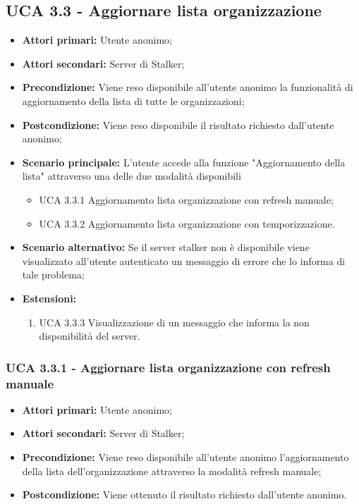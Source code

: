 \subsection{UCA 3.3 - Aggiornare lista organizzazione}%
\begin{itemize} 
	\item \textbf{Attori primari:} Utente anonimo;
	\item \textbf{Attori secondari:} Server di Stalker;
	\item \textbf{Precondizione:} Viene reso disponibile all’utente anonimo la funzionalità di aggiornamento della lista di tutte le organizzazioni;
	\item \textbf{Postcondizione:} Viene reso disponibile il risultato richiesto dall’utente anonimo;
	\item \textbf{Scenario principale:}  L’utente accede alla funzione "Aggiornamento della lista" attraverso una delle due modalità disponibili
	\begin{itemize}
		\item UCA 3.3.1 Aggiornamento lista organizzazione con refresh manuale;
		\item UCA 3.3.2 Aggiornamento lista organizzazione con temporizzazione.
	\end{itemize}
	\item \textbf{Scenario alternativo:} Se il server stalker non è disponibile viene visualizzato all’utente autenticato un messaggio di errore che lo informa di tale problema;
	\item \textbf{Estensioni:}
	\begin{enumerate}
		\item UCA 3.3.3 Visualizzazione di un messaggio che informa la non disponibilità del server.
	\end{enumerate}
\end{itemize}

\subsubsection{UCA 3.3.1 - Aggiornare lista organizzazione con refresh manuale}%
\begin{itemize}
	\item \textbf{Attori primari:} Utente anonimo;
	\item \textbf{Attori secondari:} Server di Stalker;
	\item \textbf{Precondizione:} Viene reso disponibile all’utente anonimo l’aggiornamento della lista dell’organizzazione attraverso la modalità refresh manuale;
	\item \textbf{Postcondizione:} Viene ottenuto il risultato richiesto dall’utente anonimo.
	
\end{itemize}

